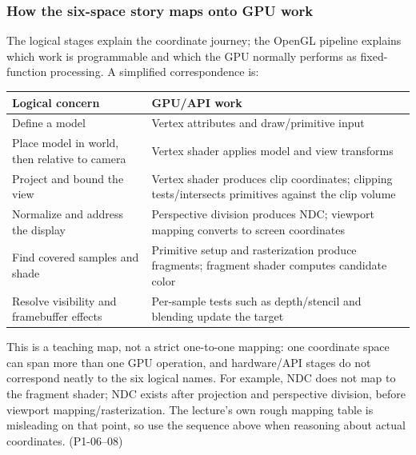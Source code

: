\subsubsection{How the six-space story maps onto GPU work}\label{03-visual-computing-i-ch018-how-the-six-space-story-maps-onto-gpu-work}

\hypertarget{03-visual-computing-i-ch018-how-the-six-space-story-maps-onto-gpu-work}{}

The logical stages explain the coordinate journey; the OpenGL pipeline explains which work is programmable and which the GPU normally performs as fixed-function processing. A simplified correspondence is:

{\def\LTcaptype{none} %
\begin{longtable}[]{@{}
  >{\raggedright\arraybackslash}p{}
  >{\raggedright\arraybackslash}p{}@{}}
\toprule\noalign{}
\begin{minipage}[b]{\linewidth}\raggedright
Logical concern
\end{minipage} & \begin{minipage}[b]{\linewidth}\raggedright
GPU/API work
\end{minipage} \\
\midrule\noalign{}
\endhead
\bottomrule\noalign{}
\endlastfoot
Define a model & Vertex attributes and draw/primitive input \\
Place model in world, then relative to camera & Vertex shader applies model and view transforms \\
Project and bound the view & Vertex shader produces clip coordinates; clipping tests/intersects primitives against the clip volume \\
Normalize and address the display & Perspective division produces NDC; viewport mapping converts to screen coordinates \\
Find covered samples and shade & Primitive setup and rasterization produce fragments; fragment shader computes candidate color \\
Resolve visibility and framebuffer effects & Per-sample tests such as depth/stencil and blending update the target \\
\end{longtable}
}

This is a teaching map, not a strict one-to-one mapping: one coordinate space can span more than one GPU operation, and hardware/API stages do not correspond neatly to the six logical names. For example, NDC does not map to the fragment shader; NDC exists after projection and perspective division, before viewport mapping/rasterization. The lecture's own rough mapping table is misleading on that point, so use the sequence above when reasoning about actual coordinates. (P1-06--08)

